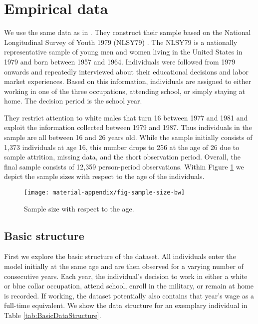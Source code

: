 \section{Empirical data}\label{Empirical data}
We use the same data as in \citet{Keane.1997}. They construct their sample based on the National Longitudinal Survey of Youth 1979 (NLSY79) \citep{NLSY.2019}. The NLSY79 is a nationally representative sample of young men and women living in the United States in 1979 and born between 1957 and 1964. Individuals were followed from 1979 onwards and repeatedly interviewed about their educational decisions and labor market experiences. Based on this information, individuals are assigned to either working in one of the three occupations, attending school, or simply staying at home. The decision period is the school year.

They restrict attention to white males that turn 16 between 1977 and 1981 and exploit the information collected between 1979 and 1987. Thus individuals in the sample are all between 16 and 26 years old. While the sample initially consists of 1,373 individuals at age 16, this number drops to 256 at the age of 26 due to sample attrition, missing data, and the short observation period. Overall, the final sample consists of 12,359 person-period observations.
Within Figure \ref{fig:SampleSizePerAge} we depict the sample sizes with respect to the age of the individuals.

\begin{figure}[h]\centering
\caption{Sample size with respect to the age.}\label{fig:SampleSizePerAge}
\texttt{[image: material-appendix/fig-sample-size-bw]}
\end{figure}

\subsection{Basic structure}
First we explore the basic structure of the dataset. All individuals enter the model initially at the same age and are then observed for a varying number of consecutive years. Each year, the individual’s decision to work in either a white or blue collar occupation, attend school, enroll in the military, or remain at home is recorded. If working, the dataset potentially also contains that year’s wage as a full-time equivalent. We show the data structure for an exemplary individual in Table \ref{tab:BasicDataStructure}.


